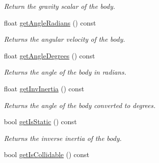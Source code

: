 \begin{DoxyCompactItemize}
\begin{DoxyCompactList}\small\item\em Return the gravity scalar of the body. \end{DoxyCompactList}\item 
\hypertarget{class_body2_d_a8bbed510d49dc7f38ce35027af2e863b}{float \hyperlink{class_body2_d_a8bbed510d49dc7f38ce35027af2e863b}{get\+Angle\+Radians} () const }\label{class_body2_d_a8bbed510d49dc7f38ce35027af2e863b}

\begin{DoxyCompactList}\small\item\em Returns the angular velocity of the body. \end{DoxyCompactList}\item 
\hypertarget{class_body2_d_a36eaf32fc309efd4e94261eff5c6b888}{float \hyperlink{class_body2_d_a36eaf32fc309efd4e94261eff5c6b888}{get\+Angle\+Degrees} () const }\label{class_body2_d_a36eaf32fc309efd4e94261eff5c6b888}

\begin{DoxyCompactList}\small\item\em Returns the angle of the body in radians. \end{DoxyCompactList}\item 
\hypertarget{class_body2_d_ab533c98d0de3941202bf51b326cca07c}{float \hyperlink{class_body2_d_ab533c98d0de3941202bf51b326cca07c}{get\+Inv\+Inertia} () const }\label{class_body2_d_ab533c98d0de3941202bf51b326cca07c}

\begin{DoxyCompactList}\small\item\em Returns the angle of the body converted to degrees. \end{DoxyCompactList}\item 
\hypertarget{class_body2_d_a4aa31574a94a2f0662d9fc9466caf833}{bool \hyperlink{class_body2_d_a4aa31574a94a2f0662d9fc9466caf833}{get\+Is\+Static} () const }\label{class_body2_d_a4aa31574a94a2f0662d9fc9466caf833}

\begin{DoxyCompactList}\small\item\em Returns the inverse inertia of the body. \end{DoxyCompactList}\item 
\hypertarget{class_body2_d_aaa665f93d6c29015d30e79971a07bd9c}{bool \hyperlink{class_body2_d_aaa665f93d6c29015d30e79971a07bd9c}{get\+Is\+Collidable} () const }\label{class_body2_d_aaa665f93d6c29015d30e79971a07bd9c}


\end{DoxyCompactItemize}
